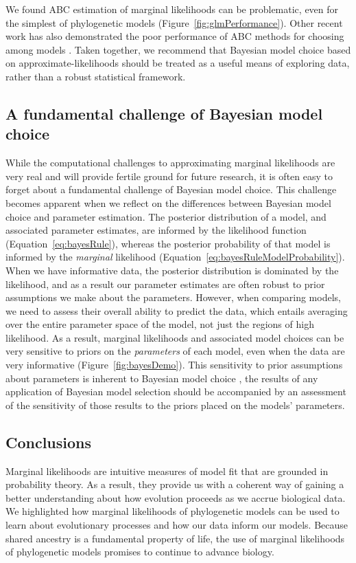 We found ABC estimation of marginal likelihoods can be problematic,
even for the simplest of phylogenetic models
(Figure~\ref{fig:glmPerformance}).
Other recent work has also demonstrated the poor performance of ABC methods for
choosing among models \citep{Robert2011,Oaks2012,Oaks2014reply}.
Taken together, we recommend that Bayesian model choice based on
approximate-likelihoods should be treated as a useful means of exploring data,
rather than a robust statistical framework.


\subsection{A fundamental challenge of Bayesian model choice}

While the computational challenges to approximating marginal likelihoods
are very real and will provide fertile ground for future research,
it is often easy to forget about a fundamental challenge of Bayesian model
choice.
This challenge becomes apparent when we reflect on the differences between
Bayesian model choice and parameter estimation.
The posterior distribution of a model, and associated parameter estimates, are
informed by the likelihood function (Equation~\ref{eq:bayesRule}),
whereas the posterior probability of that model is informed by the
\emph{marginal} likelihood
(Equation~\ref{eq:bayesRuleModelProbability}).
When we have informative data, the posterior distribution is dominated by the
likelihood, and as a result our parameter estimates are often robust to prior
assumptions we make about the parameters.
However, when comparing models, we need to assess their overall ability to
predict the data, which entails averaging over the entire parameter space of
the model, not just the regions of high likelihood.
As a result, marginal likelihoods and associated model choices can be very
sensitive to priors on the \emph{parameters} of each model, even when the data
are very informative (Figure~\ref{fig:bayesDemo}).
This sensitivity to prior assumptions about parameters is inherent to Bayesian
model choice
, the results of any application of Bayesian
model selection should be accompanied by an assessment of the sensitivity of
those results to the priors placed on the models' parameters.


\subsection{Conclusions}

Marginal likelihoods are intuitive measures of model fit that are grounded in
probability theory.
As a result, they provide us with a coherent way of gaining a better
understanding about how evolution proceeds as we accrue biological data.
We highlighted how marginal likelihoods of phylogenetic models can be used to
learn about evolutionary processes and how our data inform our models.
Because shared ancestry is a fundamental property of life, the use of marginal
likelihoods of phylogenetic models promises to continue to advance biology.
